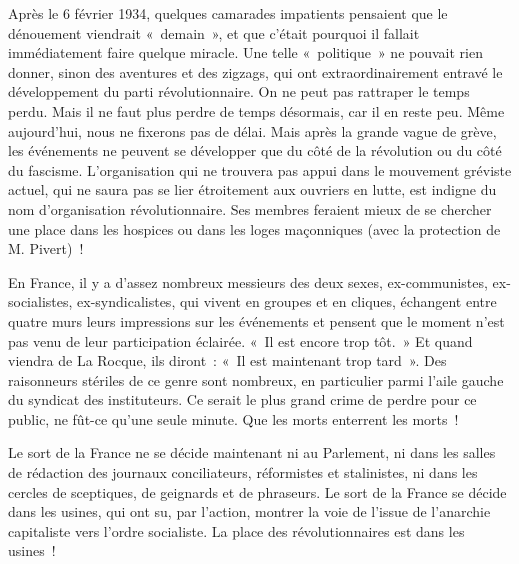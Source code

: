 \documentclass[french,twoside]{book} %
\begin{document}
Après le 6 février 1934, quelques camarades impatients pensaient que le dénouement viendrait « demain », et que c’était pourquoi il fallait immédiatement faire quelque miracle. Une telle « politique » ne pouvait rien donner, sinon des aventures et des zigzags, qui ont extraordinairement entravé le développement du parti révolutionnaire. On ne peut pas rattraper le temps perdu. Mais il ne faut plus perdre de temps désormais, car il en reste peu. Même aujourd’hui, nous ne fixerons pas de délai. Mais après la grande vague de grève, les événements ne peuvent se développer que du côté de la révolution ou du côté du fascisme. L’organisation qui ne trouvera pas appui dans le mouvement gréviste actuel, qui ne saura pas se lier étroitement aux ouvriers en lutte, est indigne du nom d’organisation révolutionnaire. Ses membres feraient mieux de se chercher une place dans les hospices ou dans les loges maçonniques (avec la protection de M. Pivert) !\par
En France, il y a d’assez nombreux messieurs des deux sexes, ex-communistes, ex-socialistes, ex-syndicalistes, qui vivent en groupes et en cliques, échangent entre quatre murs leurs impressions sur les événements et pensent que le moment n’est pas venu de leur participation éclairée. « Il est encore trop tôt. » Et quand viendra de La Rocque, ils diront : « Il est maintenant trop tard ». Des raisonneurs stériles de ce genre sont nombreux, en particulier parmi l’aile gauche du syndicat des instituteurs. Ce serait le plus grand crime de perdre pour ce public, ne fût-ce qu’une seule minute. Que les morts enterrent les morts !\par
Le sort de la France ne se décide maintenant ni au Parlement, ni dans les salles de rédaction des journaux conciliateurs, réformistes et stalinistes, ni dans les cercles de sceptiques, de geignards et de phraseurs. Le sort de la  France se décide dans les usines, qui ont su, par l’action, montrer la voie de l’issue de l’anarchie capitaliste vers l’ordre socialiste. La place des révolutionnaires est dans les usines !\par
\end{document}
